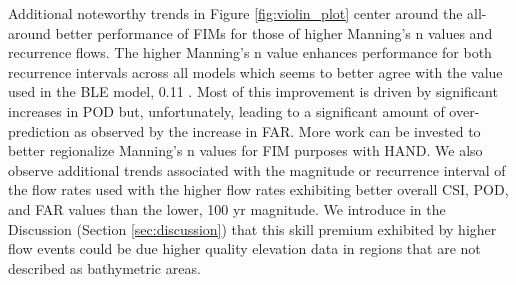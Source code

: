 \documentclass[draft]{dependencies/agujournal2019}
\begin{document}
Additional noteworthy trends in Figure \ref{fig:violin_plot} center around the all-around better performance of FIMs for those of higher Manning's n values and recurrence flows.
The higher Manning's n value enhances performance for both recurrence intervals across all models which seems to better agree with the value used in the BLE model, 0.11 \cite{fema2021base,fema2021estimated}.
Most of this improvement is driven by significant increases in POD but, unfortunately, leading to a significant amount of over-prediction as observed by the increase in FAR.
More work can be invested to better regionalize Manning's n values for FIM purposes with HAND.
We also observe additional trends associated with the magnitude or recurrence interval of the flow rates used with the higher flow rates exhibiting better overall CSI, POD, and FAR values than the lower, 100 yr magnitude.
We introduce in the Discussion (Section \ref{sec:discussion}) that this skill premium exhibited by higher flow events could be due higher quality elevation data in regions that are not described as bathymetric areas.
%
\end{document}
